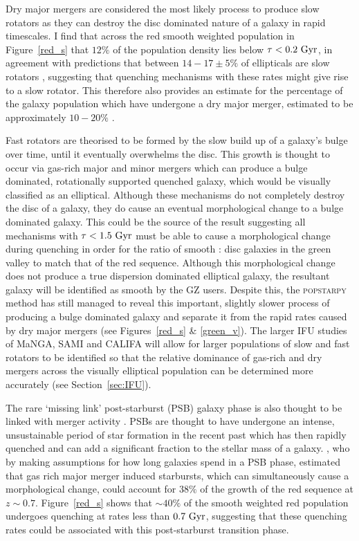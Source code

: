 Dry major mergers are considered the most likely process to produce slow rotators \citep{duc11, naab14} as they can destroy the disc dominated nature of a galaxy \citep{toomre72} in rapid timescales. I find that across the red smooth weighted population in Figure~\ref{red_s} that $12\%$ of the population density lies below $\tau <0.2~\rm{Gyr}$, in agreement with predictions that between $14-17\pm5\%$ of ellipticals are slow rotators \citep{emsellem11, stott16}, suggesting that quenching mechanisms with these rates might give rise to a slow rotator. This therefore also provides an estimate for the percentage of the galaxy population which have undergone a dry major merger, estimated to be approximately $10-20\%$ \citep[since $z\sim1$;][]{khochfar09}.

Fast rotators are theorised to be formed by the slow build up of a galaxy's bulge over time, until it eventually overwhelms the disc. This growth is thought to occur via gas-rich major and minor mergers \citep{duc11} which can produce a bulge dominated, rotationally supported quenched galaxy, which would be visually classified as an elliptical. Although these mechanisms do not completely destroy the disc of a galaxy, they do cause an eventual morphological change to a bulge dominated galaxy. This could be the source of the result suggesting all mechanisms with $\tau < 1.5 ~\rm{Gyr}$ must be able to cause a morphological change during quenching in order for the ratio of smooth : disc galaxies in the green valley to match that of the red sequence. Although this morphological change does not produce a true dispersion dominated elliptical galaxy, the resultant galaxy will be identified as smooth by the GZ users. Despite this, the \textsc{popstarpy} method has still managed to reveal this important, slightly slower process of producing a bulge dominated galaxy and separate it from the rapid rates caused by dry major mergers (see Figures~\ref{red_s} \& \ref{green_v}). The larger IFU studies of MaNGA, SAMI and CALIFA will allow for larger populations of slow and fast rotators to be identified so that the relative dominance of gas-rich and dry mergers across the visually elliptical population can be determined more accurately (see Section~\ref{sec:IFU}). 

The rare \citep[$<1\%$;][]{Wong12, wild16} `missing link' post-starburst (PSB) galaxy phase is also thought to be linked with merger activity \citep{zabludoff96, blake04, goto05b, yang08, pawlik16}. PSBs are thought to have undergone an intense, unsustainable period of star formation in the recent past which has then rapidly quenched \citep{dressler83, abraham96b, poggianti99, goto03, goto05b, goto07} and can add a significant fraction \citep[$\sim10\%$;][]{wild10} to the stellar mass of a galaxy. \citet{Wild09}, who by making assumptions for how long galaxies spend in a PSB phase, estimated that gas rich major merger induced starbursts, which can simultaneously cause a morphological change, could account for $38\%$ of the growth of the red sequence at $z\sim0.7$. Figure~\ref{red_s} shows that $\sim40\%$ of the smooth weighted red population undergoes quenching at rates less than $0.7~\rm{Gyr}$, suggesting that these quenching rates could be associated with this post-starburst transition phase. 

